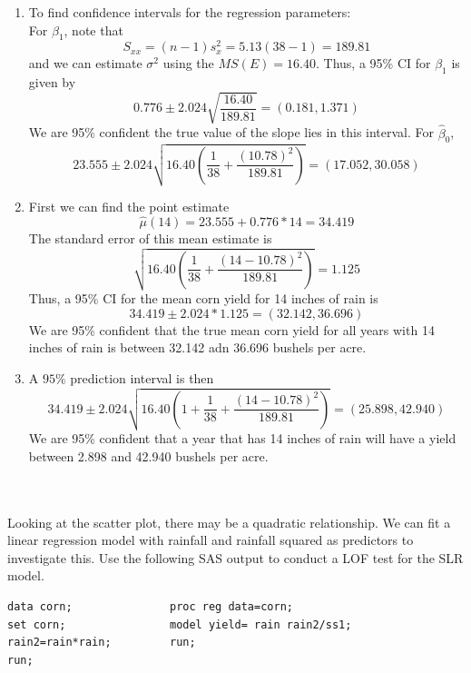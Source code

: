 \begin{enumerate}
\item To find confidence intervals for the regression parameters:\\
For $\beta_1$, note that \\
$$S_{xx}=(n-1)s_x^2=5.13(38-1)=189.81$$
and we can estimate $\sigma^2$ using the $MS(E)=16.40$.  Thus, a 95\% CI for $\beta_1$ is given by
$$0.776 \pm 2.024 \sqrt{\frac{16.40}{189.81}} =(0.181, 1.371)$$
We are 95\% confident the true value of the slope lies in this interval.
For $\hat{\beta}_0$,
$$ 23.555 \pm 2.024 \sqrt{16.40\left(\frac{1}{38}+\frac{(10.78)^2}{189.81}\right)} =(17.052, 30.058)$$
\item First we can find the point estimate 
$$\hat\mu(14)=23.555+0.776*14 =  34.419$$ 
The standard error of this mean estimate is 
$$ \sqrt{16.40\left(\frac{1}{38}+\frac{(14-10.78)^2}{189.81}\right)}=1.125  $$
Thus, a 95\% CI for the mean corn yield for 14 inches of rain is
$$34.419 \pm 2.024*1.125 = (32.142, 36.696)$$
We are 95\% confident that the true mean corn yield for all years with 14 inches of rain is between 32.142 adn 36.696 bushels per acre.
\item A $95\%$ prediction interval is then
$$ 34.419 \pm 2.024 \sqrt{16.40\left(1+\frac{1}{38}+\frac{(14-10.78)^2}{189.81}\right)}=(25.898, 42.940) $$
We are 95\% confident that a year that has 14 inches of rain will have a yield between 2.898 and 42.940 bushels per acre.
\end{enumerate}

~\\~\\
Looking at the scatter plot, there may be a quadratic relationship.  We can fit a linear regression model with rainfall and rainfall squared as predictors to investigate this. Use the following SAS output to conduct a LOF test for the SLR model.
\begin{small}
\begin{verbatim}
data corn;               proc reg data=corn;
set corn;                model yield= rain rain2/ss1;
rain2=rain*rain;         run;
run;
\end{verbatim}
\end{small}

